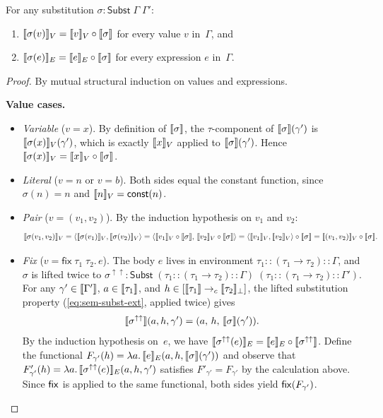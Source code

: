 \begin{proposition}
\label{prop:substitution-lemma}
For any substitution $\sigma : \mathsf{Subst}\;\Gamma\;\Gamma'$:
\begin{enumerate}
  \item $\llbracket \sigma(v) \rrbracket_V = \llbracket v \rrbracket_V \circ \llbracket \sigma \rrbracket$ for
    every value $v$ in~$\Gamma$, and
  \item $\llbracket \sigma(e) \rrbracket_E = \llbracket e \rrbracket_E \circ \llbracket \sigma \rrbracket$ for
    every expression $e$ in~$\Gamma$.
\end{enumerate}
\end{proposition}
\begin{proof}
By mutual structural induction on values and expressions.

\medskip\noindent
\textbf{Value cases.}
\begin{itemize}
  \item \emph{Variable} ($v = x$). By definition of $\llbracket \sigma \rrbracket$,
    the $\tau$-component of $\llbracket \sigma \rrbracket(\gamma')$ is
    $\llbracket \sigma(x) \rrbracket_V(\gamma')$, which is exactly $\llbracket x \rrbracket_V$ applied
    to $\llbracket \sigma \rrbracket(\gamma')$.  Hence $\llbracket \sigma(x) \rrbracket_V =
    \llbracket x \rrbracket_V \circ \llbracket \sigma \rrbracket$.

  \item \emph{Literal} ($v = n$ or $v = b$).  Both sides equal the
    constant function, since $\sigma(n) = n$ and
    $\llbracket n \rrbracket_V = \mathsf{const}(n)$.

  \item \emph{Pair} ($v = (v_1, v_2)$).  By the induction hypothesis
    on $v_1$ and $v_2$:
    \[
      \llbracket \sigma(v_1, v_2) \rrbracket_V
      = \langle \llbracket \sigma(v_1) \rrbracket_V, \llbracket \sigma(v_2) \rrbracket_V \rangle
      = \langle \llbracket v_1 \rrbracket_V \circ \llbracket \sigma \rrbracket,\,
               \llbracket v_2 \rrbracket_V \circ \llbracket \sigma \rrbracket \rangle
      = \langle \llbracket v_1 \rrbracket_V, \llbracket v_2 \rrbracket_V \rangle \circ \llbracket \sigma \rrbracket
      = \llbracket (v_1, v_2) \rrbracket_V \circ \llbracket \sigma \rrbracket.
    \]

  \item \emph{Fix} ($v = \mathsf{fix}\;\tau_1\;\tau_2.\,e$).  The body
    $e$ lives in environment $\tau_1 :: (\tau_1 \to \tau_2) :: \Gamma$,
    and $\sigma$ is lifted twice to
    $\sigma^{\uparrow\uparrow} :
    \mathsf{Subst}\;(\tau_1 :: (\tau_1 \to \tau_2) :: \Gamma)\;
                    (\tau_1 :: (\tau_1 \to \tau_2) :: \Gamma')$.
    For any $\gamma' \in \llbracket \Gamma' \rrbracket$, $a \in \llbracket \tau_1 \rrbracket$, and
    $h \in [\llbracket \tau_1 \rrbracket \to_c \llbracket \tau_2 \rrbracket_\bot]$, the lifted
    substitution property (\cref{eq:sem-subst-ext}, applied twice) gives
    \[
      \llbracket \sigma^{\uparrow\uparrow} \rrbracket(a, h, \gamma')
      = (a,\, h,\, \llbracket \sigma \rrbracket(\gamma')).
    \]
    By the induction hypothesis on~$e$, we have
    $\llbracket \sigma^{\uparrow\uparrow}(e) \rrbracket_E
    = \llbracket e \rrbracket_E \circ \llbracket \sigma^{\uparrow\uparrow} \rrbracket$.
    Define the functional $F_{\gamma'}(h) = \lambda a.\,
    \llbracket e \rrbracket_E(a, h, \llbracket \sigma \rrbracket(\gamma'))$ and observe that
    $F'_{\gamma'}(h) = \lambda a.\,
    \llbracket \sigma^{\uparrow\uparrow}(e) \rrbracket_E(a, h, \gamma')$ satisfies
    $F'_{\gamma'} = F_{\gamma'}$ by the calculation above.
    Since $\mathsf{fix}$ is applied to the same functional, both sides yield
    $\mathsf{fix}(F_{\gamma'})$.
\end{itemize}


\end{proof}
